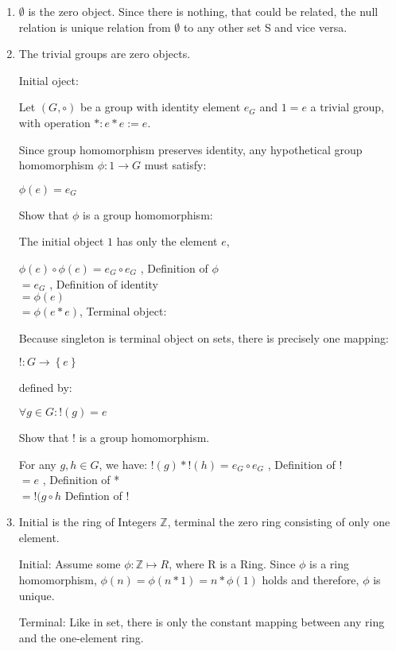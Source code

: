 \begin{answer}
  \begin{enumerate}
  \item $\emptyset$ is the zero object. Since there is nothing, that could be related, the null relation is unique relation from $\emptyset$ to any other set S and vice versa.
  \item The trivial groups are zero objects.

    Initial oject:

    Let $\left({G, \circ}\right)$ be a group with identity element $e_G$ and $1={e}$ a trivial group, with operation $*: e*e := e$.

    Since group homomorphism preserves identity, any hypothetical group homomorphism $\phi: 1 \to G$ must satisfy:

    $\phi (e) = e_G$

    Show  that $\phi$ is  a group homomorphism:

    The initial object $1$ has only the element $e$,

    $\phi (e) \circ \phi (e) = e_G \circ e_G $ , Definition of $\phi$
    \\$= e_G$ , Definition of identity
    \\$= \phi (e)$
    \\$= \phi (e * e)$, Terminal object:

    Because singleton is terminal object on sets, there is precisely one mapping:

    $!: G \to \left\{{e}\right\}$

    defined by:

    $\forall g \in G: ! (g) = e$

    Show that $!$ is a group homomorphism.

    For any $g, h \in G$, we have:
    $!(g)*!(h) = e_G \circ e_G $ , Definition of !
    \\$= e$ , Definition of *
    \\$= !(g \circ h$ Defintion of !

  \item Initial is the ring of Integers $\mathbb{Z}$, terminal the zero ring consisting of only one element.

    Initial: Assume some $ \phi: \mathbb{Z} \mapsto R $, where R is a Ring. Since $\phi$ is a ring homomorphism, $\phi(n) = \phi(n*1) = n*\phi(1)$ holds and therefore, $\phi$ is unique.

    Terminal: Like in set, there is only the constant mapping between any ring and the one-element ring.
  \end{enumerate}
\end{answer}

